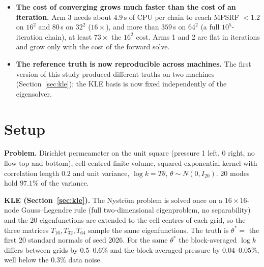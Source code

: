 \documentclass[11pt]{article}
\begin{document}
\begin{itemize}
\item \textbf{The cost of converging grows much faster than the cost of an iteration.} Arm 3 needs about $4.9$\,s of CPU per chain to reach MPSRF $<1.2$ on $16^2$ and $80$\,s on $32^2$ ($16\times$), and more than $359$\,s on $64^2$ (a full $10^5$-iteration chain), at least $73\times$ the $16^2$ cost. Arms 1 and 2 are flat in iterations and grow only with the cost of the forward solve.
\item \textbf{The reference truth is now reproducible across machines.} The first version of this study produced different truths on two machines (Section~\ref{sec:kle}); the KLE basis is now fixed independently of the eigensolver.
\end{itemize}

\section{Setup}
\textbf{Problem.} Dirichlet permeameter on the unit square (pressure 1 left, 0 right, no flow top and bottom), cell-centred finite volume, squared-exponential kernel with correlation length $0.2$ and unit variance, $\log k=T\theta$, $\theta\sim N(0,I_{20})$. 20 modes hold $97.1\%$ of the variance.

\textbf{KLE (Section~\ref{sec:kle}).} The Nystr\"om problem is solved once on a $16\times16$-node Gauss--Legendre rule (full two-dimensional eigenproblem, no separability) and the 20 eigenfunctions are extended to the cell centres of each grid, so the three matrices $T_{16},T_{32},T_{64}$ sample the same eigenfunctions. The truth is $\theta^*=$ the first 20 standard normals of seed 2026. For the same $\theta^*$ the block-averaged $\log k$ differs between grids by $0.5$--$0.6\%$ and the block-averaged pressure by $0.04$--$0.05\%$, well below the $0.3\%$ data noise.
\end{document}
